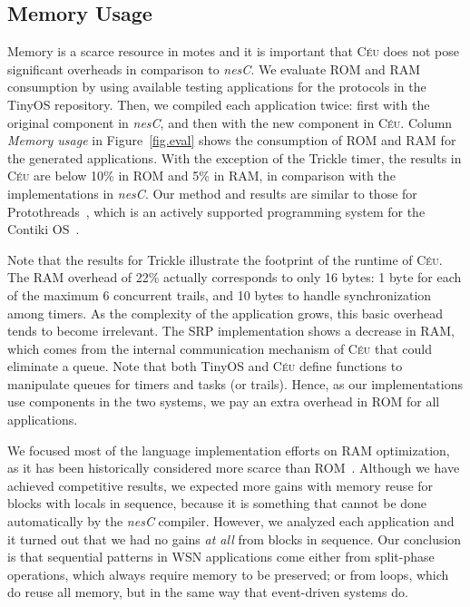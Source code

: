 \documentclass[letterpaper]{sig-alternate}
\newcommand{\CEU}{\textsc{C\'{e}u}\xspace}
\begin{document}
\subsection{Memory Usage}
\label{sec.eval.resource}

Memory is a scarce resource in motes and it is important that \CEU does not 
pose significant overheads in comparison to \emph{nesC}.
%
We evaluate ROM and RAM consumption by using available testing applications for 
the protocols in the TinyOS repository.
Then, we compiled each application twice: first with the original component in 
\emph{nesC}, and then with the new component in \CEU.
%
Column \emph{Memory usage} in Figure~\ref{fig.eval} shows the consumption of 
ROM and RAM for the generated applications.
With the exception of the Trickle timer, the results in \CEU are below 10\% in 
ROM and 5\% in RAM, in comparison with the implementations in \emph{nesC}.
%
Our method and results are similar to those for
Protothreads~\cite{wsn.protothreads}, which is an actively supported 
programming system for the Contiki OS~\cite{wsn.contiki}.

Note that the results for Trickle illustrate the footprint of the runtime of 
\CEU.
The RAM overhead of 22\% actually corresponds to only 16 bytes: 1 byte for each 
of the maximum 6 concurrent trails, and 10 bytes to handle synchronization 
among timers.
%
As the complexity of the application grows, this basic overhead tends to become 
irrelevant.
%
The SRP implementation shows a decrease in RAM, which comes from the internal 
communication mechanism of \CEU that could eliminate a queue.
%
Note that both TinyOS and \CEU define functions to manipulate queues for timers 
and tasks (or trails).
Hence, as our implementations use components in the two systems, we pay an 
extra overhead in ROM for all applications.

We focused most of the language implementation efforts on RAM optimization, as 
it has been historically considered more scarce than ROM~\cite{wsn.decade}.
Although we have achieved competitive results, we expected more gains with 
memory reuse for blocks with locals in sequence, because it is something that 
cannot be done automatically by the \emph{nesC} compiler.
However, we analyzed each application and it turned out that we had no gains 
\emph{at all} from blocks in sequence.
Our conclusion is that sequential patterns in WSN applications come either from 
split-phase operations, which always require memory to be preserved;
or from loops, which do reuse all memory, but in the same way that event-driven 
systems do.
\end{document}
